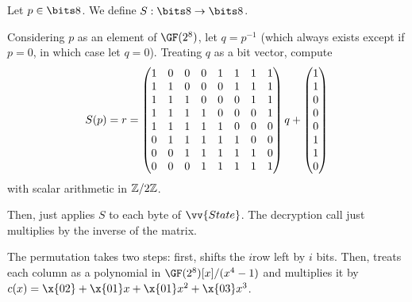 \documentclass[class=co487,tikz,minted,notes]{agony}
\begin{document}
\begin{defn*}
  Let $p \in \bits8$. We define $S : \bits8 \to \bits8$.

  Considering $p$ as an element of $\GF(2^8)$,
  let $q = p^{-1}$ (which always exists except if $p = 0$, in which case let $q=0$).
  Treating $q$ as a bit vector, compute
  \[
    S(p) = r = \begin{pmatrix}
      1 & 0 & 0 & 0 & 1 & 1 & 1 & 1 \\
      1 & 1 & 0 & 0 & 0 & 1 & 1 & 1 \\
      1 & 1 & 1 & 0 & 0 & 0 & 1 & 1 \\
      1 & 1 & 1 & 1 & 0 & 0 & 0 & 1 \\
      1 & 1 & 1 & 1 & 1 & 0 & 0 & 0 \\
      0 & 1 & 1 & 1 & 1 & 1 & 0 & 0 \\
      0 & 0 & 1 & 1 & 1 & 1 & 1 & 0 \\
      0 & 0 & 0 & 1 & 1 & 1 & 1 & 1
    \end{pmatrix}q
    + \mqty(1\\1\\0\\0\\0\\1\\1\\0)
  \]
  with scalar arithmetic in $\mathbb{Z}/2\mathbb{Z}$.
\end{defn*}

Then,  just applies $S$ to each byte of $\vv{State}$.
The decryption call  just multiplies by the inverse of the matrix.

The permutation takes two steps:
first,  shifts the $i$\xth row left by $i$ bits.
Then,  treats each column as a polynomial in $\GF(2^8)[x]/(x^4-1)$
and multiplies it by $c(x) = \x{02} + \x{01}x + \x{01}x^2 + \x{03}x^3$.
\end{document}
